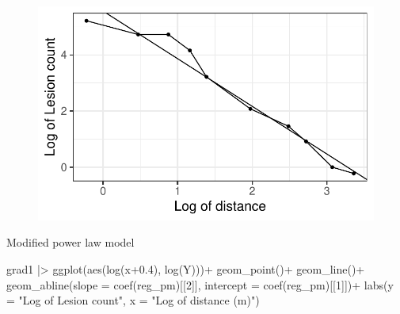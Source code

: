\documentclass[
  letterpaper,
  DIV=11,
  numbers=noendperiod]{scrreprt}
\newenvironment{Shaded}{\begin{snugshade}}{\end{snugshade}}
\newcommand{\AttributeTok}[1]{\textcolor[rgb]{0.40,0.45,0.13}{#1}}
\newcommand{\DecValTok}[1]{\textcolor[rgb]{0.68,0.00,0.00}{#1}}
\newcommand{\FloatTok}[1]{\textcolor[rgb]{0.68,0.00,0.00}{#1}}
\newcommand{\FunctionTok}[1]{\textcolor[rgb]{0.28,0.35,0.67}{#1}}
\newcommand{\NormalTok}[1]{\textcolor[rgb]{0.00,0.23,0.31}{#1}}
\newcommand{\SpecialCharTok}[1]{\textcolor[rgb]{0.37,0.37,0.37}{#1}}
\newcommand{\StringTok}[1]{\textcolor[rgb]{0.13,0.47,0.30}{#1}}
\begin{document}
\begin{figure}[H]

{\centering \includegraphics{./spatial-fitting_files/figure-pdf/unnamed-chunk-16-1.pdf}

}

\end{figure}

Modified power law model

\begin{Shaded}
\begin{Highlighting}[]
\NormalTok{grad1 }\SpecialCharTok{|\textgreater{}} 
  \FunctionTok{ggplot}\NormalTok{(}\FunctionTok{aes}\NormalTok{(}\FunctionTok{log}\NormalTok{(x}\FloatTok{+0.4}\NormalTok{), }\FunctionTok{log}\NormalTok{(Y)))}\SpecialCharTok{+}
  \FunctionTok{geom\_point}\NormalTok{()}\SpecialCharTok{+}
  \FunctionTok{geom\_line}\NormalTok{()}\SpecialCharTok{+}
  \FunctionTok{geom\_abline}\NormalTok{(}\AttributeTok{slope =} \FunctionTok{coef}\NormalTok{(reg\_pm)[[}\DecValTok{2}\NormalTok{]], }\AttributeTok{intercept =} \FunctionTok{coef}\NormalTok{(reg\_pm)[[}\DecValTok{1}\NormalTok{]])}\SpecialCharTok{+}
 \FunctionTok{labs}\NormalTok{(}\AttributeTok{y =} \StringTok{"Log of Lesion count"}\NormalTok{,}
       \AttributeTok{x =} \StringTok{"Log of distance (m)"}\NormalTok{)}
\end{Highlighting}
\end{Shaded}
\end{document}
